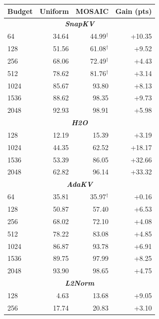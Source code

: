 \documentclass[11pt]{article}
\begin{document}
\begin{table}[t]
  \centering
  \small
  \setlength{\tabcolsep}{16pt}
  \begin{tabular}{@{} l r r r @{}}
    \toprule
    \textbf{Budget} & \textbf{Uniform} & \textbf{MOSAIC} & \textbf{Gain (pts)} \\
    \midrule
    \multicolumn{4}{c}{\textbf{\textit{SnapKV}}} \\
    \midrule
    \rowcolor{gray!10}
    64 & 34.64 & 44.99$^\dagger$ & +10.35 \\
    128 & 51.56 & 61.08$^\dagger$ & +9.52 \\
    \rowcolor{gray!10}
    256 & 68.06 & 72.49$^\dagger$ & +4.43 \\
    512 & 78.62 & 81.76$^\dagger$ & +3.14 \\
    \rowcolor{gray!10}
    1024 & 85.67 & 93.80 & +8.13 \\
    1536 & 88.62 & 98.35 & +9.73 \\
    \rowcolor{gray!10}
    2048 & 92.93 & 98.91 & +5.98 \\
    \midrule
    \multicolumn{4}{c}{\textbf{\textit{H2O}}} \\
    \midrule
    \rowcolor{gray!10}
    128 & 12.19 & 15.39 & +3.19 \\
    1024 & 44.35 & 62.52 & +18.17 \\
    \rowcolor{gray!10}
    1536 & 53.39 & 86.05 & +32.66 \\
    2048 & 62.82 & 96.14 & +33.32 \\
    \midrule
    \multicolumn{4}{c}{\textbf{\textit{AdaKV}}} \\
    \midrule
    \rowcolor{gray!10}
    64 & 35.81 & 35.97$^\dagger$ & +0.16 \\
    128 & 50.87 & 57.40 & +6.53 \\
    \rowcolor{gray!10}
    256 & 68.02 & 72.10 & +4.08 \\
    512 & 78.22 & 83.08 & +4.85 \\
    \rowcolor{gray!10}
    1024 & 86.87 & 93.78 & +6.91 \\
    1536 & 89.75 & 97.99 & +8.25 \\
    \rowcolor{gray!10}
    2048 & 93.90 & 98.65 & +4.75 \\
    \midrule
    \multicolumn{4}{c}{\textbf{\textit{L2Norm}}} \\
    \midrule
    \rowcolor{gray!10}
    128 & 4.63 & 13.68 & +9.05 \\
    256 & 17.74 & 20.83 & +3.10 \\

\end{tabular}
\end{table}
\end{document}
